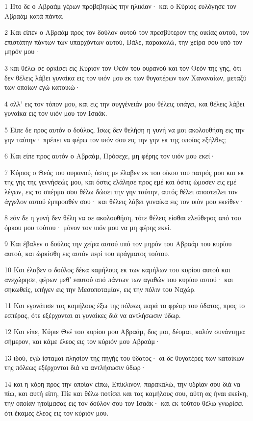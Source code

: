 \par 1 Ήτο δε ο Αβραάμ γέρων προβεβηκώς την ηλικίαν· και ο Κύριος ευλόγησε τον Αβραάμ κατά πάντα.
\par 2 Και είπεν ο Αβραάμ προς τον δούλον αυτού τον πρεσβύτερον της οικίας αυτού, τον επιστάτην πάντων των υπαρχόντων αυτού, Βάλε, παρακαλώ, την χείρα σου υπό τον μηρόν μου·
\par 3 και θέλω σε ορκίσει εις Κύριον τον Θεόν του ουρανού και τον Θεόν της γης, ότι δεν θέλεις λάβει γυναίκα εις τον υιόν μου εκ των θυγατέρων των Χαναναίων, μεταξύ των οποίων εγώ κατοικώ·
\par 4 αλλ' εις τον τόπον μου, και εις την συγγένειάν μου θέλεις υπάγει, και θέλεις λάβει γυναίκα εις τον υιόν μου τον Ισαάκ.
\par 5 Είπε δε προς αυτόν ο δούλος, Ίσως δεν θελήση η γυνή να μοι ακολουθήση εις την γην ταύτην· πρέπει να φέρω τον υιόν σου εις την γην εκ της οποίας εξήλθες;
\par 6 Και είπε προς αυτόν ο Αβραάμ, Πρόσεχε, μη φέρης τον υιόν μου εκεί·
\par 7 Κύριος ο Θεός του ουρανού, όστις με έλαβεν εκ του οίκου του πατρός μου και εκ της γης της γεννήσεώς μου, και όστις ελάλησε προς εμέ και όστις ώμοσεν εις εμέ λέγων, εις το σπέρμα σου θέλω δώσει την γην ταύτην, αυτός θέλει αποστείλει τον άγγελον αυτού έμπροσθέν σου· και θέλεις λάβει γυναίκα εις τον υιόν μου εκείθεν·
\par 8 εάν δε η γυνή δεν θέλη να σε ακολουθήση, τότε θέλεις είσθαι ελεύθερος από του όρκου μου τούτου· μόνον τον υιόν μου να μη φέρης εκεί.
\par 9 Και έβαλεν ο δούλος την χείρα αυτού υπό τον μηρόν του Αβραάμ του κυρίου αυτού, και ώρκίσθη εις αυτόν περί του πράγματος τούτου.
\par 10 Και έλαβεν ο δούλος δέκα καμήλους εκ των καμήλων του κυρίου αυτού και ανεχώρησε, φέρων μεθ' εαυτού από πάντων των αγαθών του κυρίου αυτού· και σηκωθείς, υπήγεν εις την Μεσοποταμίαν, εις την πόλιν του Ναχώρ.
\par 11 Και εγονάτισε τας καμήλους έξω της πόλεως παρά το φρέαρ του ύδατος, προς το εσπέρας, ότε εξέρχονται αι γυναίκες διά να αντλήσωσιν ύδωρ.
\par 12 Και είπε, Κύριε Θεέ του κυρίου μου Αβραάμ, δος μοι, δέομαι, καλόν συνάντημα σήμερον, και κάμε έλεος εις τον κύριόν μου Αβραάμ·
\par 13 ιδού, εγώ ίσταμαι πλησίον της πηγής του ύδατος· αι δε θυγατέρες των κατοίκων της πόλεως εξέρχονται διά να αντλήσωσιν ύδωρ·
\par 14 και η κόρη προς την οποίαν είπω, Επίκλινον, παρακαλώ, την υδρίαν σου διά να πίω, και αυτή είπη, Πίε και θέλω ποτίσει και τας καμήλους σου, αύτη ας ήναι εκείνη, την οποίαν ητοίμασας εις τον δούλον σου τον Ισαάκ· και εκ τούτου θέλω γνωρίσει ότι έκαμες έλεος εις τον κύριόν μου.
